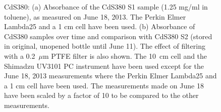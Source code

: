 \documentclass[cits]{JINST}
\begin{document}
\begin{figure}
        \begin{center}
        \caption[]{CdS380: (a) Absorbance of the CdS380 S1 sample (1.25 mg/ml in toluene), as measured on June 18, 2013. The Perkin Elmer Lambda25 and a 1 cm cell have been used. (b) Absorbance of CdS380 samples over time and comparison with CdS380 S2 (stored in original, unopened bottle until June 11). The effect of filtering with a 0.2~$\mu$m PTFE filter is also shown. The 10~cm cell and the Shimadzu UV3101 PC instrument have been used except for the June 18, 2013 measurements where the Perkin Elmer Lambda25 and a 1 cm cell have been used. The measurements made on June 18 have been scaled by a factor of 10 to be compared to the other measurements. \label{cds380_stability}}
        \end{center}
\end{figure}
\end{document}
